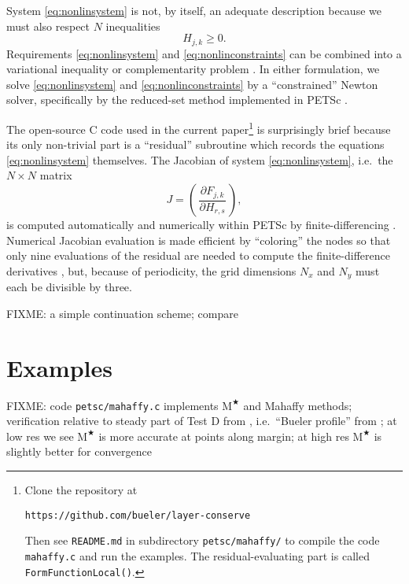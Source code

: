 \documentclass[twocolumn,letterpaper]{igs}
\newcommand{\Mstar}{$\text{M}^{\bigstar}$\xspace}
\begin{document}
System \eqref{eq:nonlinsystem} is not, by itself, an adequate description because we must also respect $N$ inequalities
\begin{equation}
H_{j,k} \ge 0.  \label{eq:nonlinconstraints}
\end{equation}
Requirements \eqref{eq:nonlinsystem} and \eqref{eq:nonlinconstraints} can be combined into a variational inequality \citep{JouvetBueler2012,KinderlehrerStampacchia1980} or complementarity problem \citep{BensonMunson2006}.  In either formulation, we solve \eqref{eq:nonlinsystem} and \eqref{eq:nonlinconstraints} by a ``constrained'' Newton solver, specifically by the reduced-set method \citep{BensonMunson2006} implemented in PETSc \citep{Balayetal2014}.

The open-source C code used in the current paper\footnote{Clone the repository at \begin{center}\texttt{https://github.com/bueler/layer-conserve}\end{center}  Then see \texttt{README.md} in subdirectory \texttt{petsc/mahaffy/} to compile the code \texttt{mahaffy.c} and run the examples.  The residual-evaluating part is called \texttt{FormFunctionLocal()}.} is surprisingly brief because its only non-trivial part is a ``residual'' subroutine which records the equations \eqref{eq:nonlinsystem} themselves.  The Jacobian of system \eqref{eq:nonlinsystem}, i.e.~the $N\times N$ matrix
\begin{equation}
J = \left(\,\frac{\partial F_{j,k}}{\partial H_{r,s}}\,\right),
\end{equation}
is computed automatically and numerically within PETSc by finite-differencing \citep{Kelley2003}.  Numerical Jacobian evaluation is made efficient by ``coloring'' the nodes so that only nine evaluations of the residual are needed to compute the finite-difference derivatives \citep{CurtisPowellReid1974}, but, because of periodicity, the grid dimensions $N_x$ and $N_y$ must each be divisible by three.

FIXME: a simple continuation scheme; compare \citep{KelleyKeyes1998}


\section{Examples} \label{sec:examples}

FIXME: code \texttt{petsc/mahaffy.c} implements \Mstar and Mahaffy methods; verification relative to steady part of Test D from \cite{Bueleretal2005}, i.e.~``Bueler profile'' from \cite{vanderVeen2013}; at low res we see \Mstar is more accurate at points along margin; at high res \Mstar is slightly better for convergence
\end{document}
